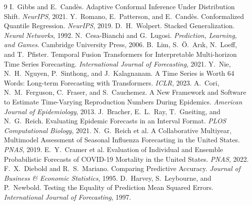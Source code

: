 \documentclass{article}
\begin{document}
\begin{thebibliography}{9}
 I.~Gibbs and E.~Cand\`es. Adaptive Conformal Inference Under Distribution
  Shift. \emph{NeurIPS}, 2021.
 Y.~Romano, E.~Patterson, and E.~Cand\`es. Conformalized Quantile
  Regression. \emph{NeurIPS}, 2019.
 D.~H.~Wolpert. Stacked Generalization. \emph{Neural Networks}, 1992.
 N.~Cesa-Bianchi and G.~Lugosi. \emph{Prediction, Learning, and
  Games}. Cambridge University Press, 2006.
 B.~Lim, S.~\"O.~Ar{\i}k, N.~Loeff, and T.~Pfister. Temporal Fusion
  Transformers for Interpretable Multi-horizon Time Series Forecasting. \emph{International
  Journal of Forecasting}, 2021.
 Y.~Nie, N.~H.~Nguyen, P.~Sinthong, and J.~Kalagnanam. A Time Series is
  Worth 64 Words: Long-term Forecasting with Transformers. \emph{ICLR}, 2023.
 A.~Cori, N.~M.~Ferguson, C.~Fraser, and S.~Cauchemez. A New Framework
  and Software to Estimate Time-Varying Reproduction Numbers During Epidemics. \emph{American
  Journal of Epidemiology}, 2013.
 J.~Bracher, E.~L.~Ray, T.~Gneiting, and N.~G.~Reich. Evaluating
  Epidemic Forecasts in an Interval Format. \emph{PLOS Computational Biology}, 2021.
 N.~G.~Reich et al. A Collaborative Multiyear, Multimodel
  Assessment of Seasonal Influenza Forecasting in the United States. \emph{PNAS}, 2019.
 E.~Y.~Cramer et al. Evaluation of Individual and Ensemble
  Probabilistic Forecasts of COVID-19 Mortality in the United States. \emph{PNAS}, 2022.
 F.~X.~Diebold and R.~S.~Mariano. Comparing Predictive Accuracy. \emph{Journal of
  Business \& Economic Statistics}, 1995.
 D.~Harvey, S.~Leybourne, and P.~Newbold. Testing the Equality of Prediction
  Mean Squared Errors. \emph{International Journal of Forecasting}, 1997.
\end{thebibliography}
\end{document}
